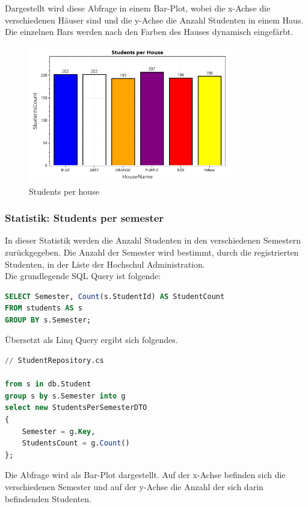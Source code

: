 \documentclass[a4paper, table]{article}
\begin{document}
Dargestellt wird diese Abfrage in einem Bar-Plot, wobei die x-Achse die verschiedenen Häuser sind und die y-Achse die Anzahl Studenten in einem Haus.
Die einzelnen Bars werden nach den Farben des Hauses dynamisch eingefärbt.

\begin{figure}[h]
    \centering
    \includegraphics[width=0.8\textwidth]{img/studentsPerHouse.png}
    \caption{Students per house}
    \label{fig:students-per-house}
\end{figure}

\newpage
\subsubsection*{Statistik: Students per semester}
In dieser Statistik werden die Anzahl Studenten in den verschiedenen Semestern zurückgegeben.
Die Anzahl der Semester wird bestimmt, durch die registrierten Studenten, in der Liste der Hochschul Administration.\\
Die grundlegende SQL Query ist folgende:

\begin{lstlisting}[language=SQL]
SELECT Semester, Count(s.StudentId) AS StudentCount
FROM students AS s
GROUP BY s.Semester;
\end{lstlisting}

Übersetzt als Linq Query ergibt sich folgendes.

\begin{lstlisting}[language=SQL]
// StudentRepository.cs

from s in db.Student
group s by s.Semester into g
select new StudentsPerSemesterDTO
{
    Semester = g.Key,
    StudentsCount = g.Count()
};
\end{lstlisting}

Die Abfrage wird als Bar-Plot dargestellt. 
Auf der x-Achse befinden sich die verschiedenen Semester und auf der y-Achse die Anzahl der sich darin befindenden Studenten.
\end{document}
